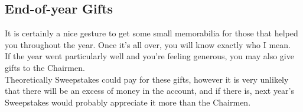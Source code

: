 \subsection{End-of-year Gifts}
It is certainly a nice gesture to get some small memorabilia for those that
helped you throughout the year. Once it's all over, you will know exactly
who I mean.
\\
If the year went particularly well and you're feeling generous, you may
also give gifts to the Chairmen.
\\
Theoretically Sweepstakes could pay for these gifts, however it is very
unlikely that there will be an excess of money in the account, and if there
is, next year's Sweepstakes would probably appreciate it more than the
Chairmen.
